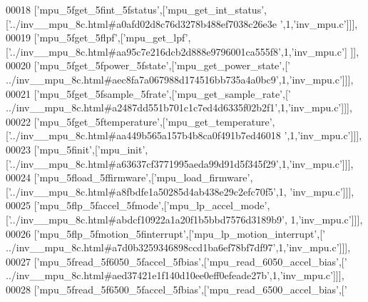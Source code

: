 \begin{DoxyCode}
00018   [\textcolor{stringliteral}{'mpu\_5fget\_5fint\_5fstatus'},[\textcolor{stringliteral}{'mpu\_get\_int\_status'},[\textcolor{stringliteral}{'../inv\_\_mpu\_8c.html#a0afd02d8c76d3278b488ef7038c26e3e
      '},1,\textcolor{stringliteral}{'inv\_mpu.c'}]]],
00019   [\textcolor{stringliteral}{'mpu\_5fget\_5flpf'},[\textcolor{stringliteral}{'mpu\_get\_lpf'},[\textcolor{stringliteral}{'../inv\_\_mpu\_8c.html#aa95c7e216dcb2d888e9796001ca555f8'},1,\textcolor{stringliteral}{'inv\_mpu.c'}]
      ]],
00020   [\textcolor{stringliteral}{'mpu\_5fget\_5fpower\_5fstate'},[\textcolor{stringliteral}{'mpu\_get\_power\_state'},[\textcolor{stringliteral}{'
      ../inv\_\_mpu\_8c.html#aec8fa7a067988d174516bb735a4a0bc9'},1,\textcolor{stringliteral}{'inv\_mpu.c'}]]],
00021   [\textcolor{stringliteral}{'mpu\_5fget\_5fsample\_5frate'},[\textcolor{stringliteral}{'mpu\_get\_sample\_rate'},[\textcolor{stringliteral}{'
      ../inv\_\_mpu\_8c.html#a2487dd551b701c1c7ed4d6335f02b2f1'},1,\textcolor{stringliteral}{'inv\_mpu.c'}]]],
00022   [\textcolor{stringliteral}{'mpu\_5fget\_5ftemperature'},[\textcolor{stringliteral}{'mpu\_get\_temperature'},[\textcolor{stringliteral}{'../inv\_\_mpu\_8c.html#aa449b565a157b4b8ca0f491b7ed46018
      '},1,\textcolor{stringliteral}{'inv\_mpu.c'}]]],
00023   [\textcolor{stringliteral}{'mpu\_5finit'},[\textcolor{stringliteral}{'mpu\_init'},[\textcolor{stringliteral}{'../inv\_\_mpu\_8c.html#a63637cf3771995aeda99d91d5f345f29'},1,\textcolor{stringliteral}{'inv\_mpu.c'}]]],
00024   [\textcolor{stringliteral}{'mpu\_5fload\_5ffirmware'},[\textcolor{stringliteral}{'mpu\_load\_firmware'},[\textcolor{stringliteral}{'../inv\_\_mpu\_8c.html#a8fbdfe1a50285d4ab438e29c2efc70f5'},1,\textcolor{stringliteral}{
      'inv\_mpu.c'}]]],
00025   [\textcolor{stringliteral}{'mpu\_5flp\_5faccel\_5fmode'},[\textcolor{stringliteral}{'mpu\_lp\_accel\_mode'},[\textcolor{stringliteral}{'../inv\_\_mpu\_8c.html#abdcf10922a1a20f1b5bbd7576d3189b9'},
      1,\textcolor{stringliteral}{'inv\_mpu.c'}]]],
00026   [\textcolor{stringliteral}{'mpu\_5flp\_5fmotion\_5finterrupt'},[\textcolor{stringliteral}{'mpu\_lp\_motion\_interrupt'},[\textcolor{stringliteral}{'
      ../inv\_\_mpu\_8c.html#a7d0b3259346898ccd1ba6ef78bf7df97'},1,\textcolor{stringliteral}{'inv\_mpu.c'}]]],
00027   [\textcolor{stringliteral}{'mpu\_5fread\_5f6050\_5faccel\_5fbias'},[\textcolor{stringliteral}{'mpu\_read\_6050\_accel\_bias'},[\textcolor{stringliteral}{'
      ../inv\_\_mpu\_8c.html#aed37421e1f140d10ee0eff0efeade27b'},1,\textcolor{stringliteral}{'inv\_mpu.c'}]]],
00028   [\textcolor{stringliteral}{'mpu\_5fread\_5f6500\_5faccel\_5fbias'},[\textcolor{stringliteral}{'mpu\_read\_6500\_accel\_bias'},[\textcolor{stringliteral}{'
}
\end{DoxyCode}
